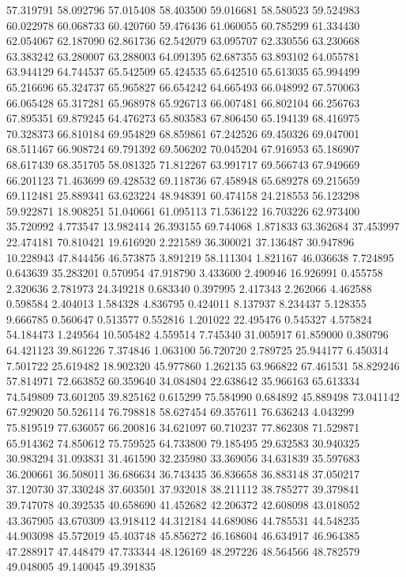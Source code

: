 57.319791
58.092796
57.015408
58.403500
59.016681
58.580523
59.524983
60.022978
60.068733
60.420760
59.476436
61.060055
60.785299
61.334430
62.054067
62.187090
62.861736
62.542079
63.095707
62.330556
63.230668
63.383242
63.280007
63.288003
64.091395
62.687355
63.893102
64.055781
63.944129
64.744537
65.542509
65.424535
65.642510
65.613035
65.994499
65.216696
65.324737
65.965827
66.654242
64.665493
66.048992
67.570063
66.065428
65.317281
65.968978
65.926713
66.007481
66.802104
66.256763
67.895351
69.879245
64.476273
65.803583
67.806450
65.194139
68.416975
70.328373
66.810184
69.954829
68.859861
67.242526
69.450326
69.047001
68.511467
66.908724
69.791392
69.506202
70.045204
67.916953
65.186907
68.617439
68.351705
58.081325
71.812267
63.991717
69.566743
67.949669
66.201123
71.463699
69.428532
69.118736
67.458948
65.689278
69.215659
69.112481
25.889341
63.623224
48.948391
60.474158
24.218553
56.123298
59.922871
18.908251
51.040661
61.095113
71.536122
16.703226
62.973400
35.720992
4.773547
13.982414
26.393155
69.744068
1.871833
63.362684
37.453997
22.474181
70.810421
19.616920
2.221589
36.300021
37.136487
30.947896
10.228943
47.844456
46.573875
3.891219
58.111304
1.821167
46.036638
7.724895
0.643639
35.283201
0.570954
47.918790
3.433600
2.490946
16.926991
0.455758
2.320636
2.781973
24.349218
0.683340
0.397995
2.417343
2.262066
4.462588
0.598584
2.404013
1.584328
4.836795
0.424011
8.137937
8.234437
5.128355
9.666785
0.560647
0.513577
0.552816
1.201022
22.495476
0.545327
4.575824
54.184473
1.249564
10.505482
4.559514
7.745340
31.005917
61.859000
0.380796
64.421123
39.861226
7.374846
1.063100
56.720720
2.789725
25.944177
6.450314
7.501722
25.619482
18.902320
45.977860
1.262135
63.966822
67.461531
58.829246
57.814971
72.663852
60.359640
34.084804
22.638642
35.966163
65.613334
74.549809
73.601205
39.825162
0.615299
75.584990
0.684892
45.889498
73.041142
67.929020
50.526114
76.798818
58.627454
69.357611
76.636243
4.043299
75.819519
77.636057
66.200816
34.621097
60.710237
77.862308
71.529871
65.914362
74.850612
75.759525
64.733800
79.185495
29.632583
30.940325
30.983294
31.093831
31.461590
32.235980
33.369056
34.631839
35.597683
36.200661
36.508011
36.686634
36.743435
36.836658
36.883148
37.050217
37.120730
37.330248
37.603501
37.932018
38.211112
38.785277
39.379841
39.747078
40.392535
40.658690
41.452682
42.206372
42.608098
43.018052
43.367905
43.670309
43.918412
44.312184
44.689086
44.785531
44.548235
44.903098
45.572019
45.403748
45.856272
46.168604
46.634917
46.964385
47.288917
47.448479
47.733344
48.126169
48.297226
48.564566
48.782579
49.048005
49.140045
49.391835
